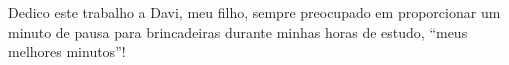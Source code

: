 
\begin{flushright}
\begin{minipage}[r]{10cm}
\vspace{15cm}
\hfill Dedico este trabalho a Davi, meu filho, sempre preocupado em 
proporcionar um minuto de pausa para brincadeiras durante minhas horas de 
estudo, ``meus melhores minutos''! \\
\end{minipage}
\end{flushright}